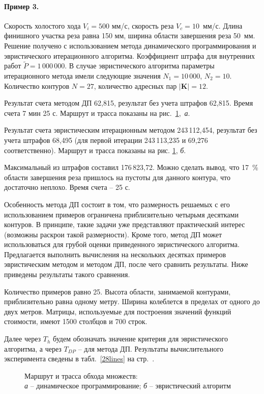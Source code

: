 \paragraph*{Пример 3.}

Скорость холостого хода $V_i=500$ мм/с,
скорость реза $V_c=10$~мм/с.
Длина финишного участка реза равна 150 мм,
ширина области завершения реза 50~мм.
Решение получено с использованием метода динамического программирования
и эвристического итерационного алгоритма.
Коэффициент штрафа для внутренних работ
$\tilde{P}=1\,000\,000$.
В случае эвристического алгоритма параметры итерационного
метода имели следующие значения
$N_1=10\,000$,
$N_2=10$.
Количество контуров $N=27$,
количество адресных пар $|\mathbf{K}|=12$.

Результат счета методом ДП 62,815,
результат без учета штрафов 62,815.
Время счета 7 мин 25 с.
Маршрут и трасса показаны на рис.~\ref{fig:Sample3},~{\it а}.

Результат счета эвристическим итерационным методом 243\,112,454,
результат без учета штрафов 68,495
(для первой итерации 243\,113,235 и 69,276
соответственно).
Маршрут и трасса показаны на рис. \ref{fig:Sample3}, {\it б}.

Максимальный из штрафов составил 176\,823,72.
Можно сделать вывод, что 17~\% области завершения реза пришлось на пустоты для
данного контура, что достаточно неплохо.
Время счета -- 25 с.

Особенность метода ДП состоит в том,
что размерность решаемых с его использованием примеров
ограничена приблизительно четырьмя десятками контуров.
В принципе, такие задачи уже представляют практический интерес
(возможны раскрои такой размерности).
Кроме того, метод ДП может использоваться для грубой оценки
приведенного эвристического алгоритма.
Предлагается выполнить вычисления на нескольких десятках
примеров эвристическим методом и методом ДП,
после чего сравнить результаты.
Ниже приведены результаты такого сравнения.

Количество примеров равно 25.
Высота области, занимаемой контурами,
приблизительно равна одному метру.
Ширина колеблется в пределах от одного до двух метров.
Матрицы, используемые для построения значений функций стоимости,
имеют 1500 столбцов и 700 строк.

Далее через
$T_h$ будем обозначать значение критерия для эвристического алгоритма,
а через $T_{DP}$ -- для метода ДП.
Результаты вычислительного эксперимента
сведены в табл.~\ref{28lines}
на стр.~\pageref{28lines}.

\begin{figure}[p]
  \centering
  \caption{
    Маршрут и трасса обхода множеств:\\
    {\it а} -- динамическое программирование;
    {\it б} -- эвристический алгоритм
    }
  \label{fig:Sample3}
\end{figure}

